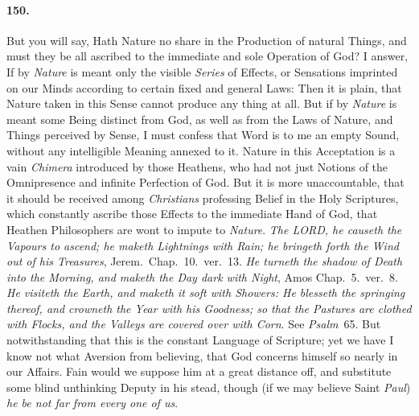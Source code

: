 \documentclass[]{article}
\newenvironment{sectionbody}{\begin{multicols}{2}}{\end{multicols}}
\begin{document}
\begin{sectionbody}
\paragraph{150.} But you will say, Hath Nature no share in the Production of
natural Things, and must they be all ascribed to the immediate
and sole Operation of {\sc God}? I answer, If by \emph{Nature}
is meant only the visible \emph{Series} of Effects, or
Sensations imprinted on our Minds according to certain fixed and
general Laws: Then it is plain, that Nature taken in this Sense
cannot produce any thing at all.  But if by \emph{Nature} is
meant some Being distinct from {\sc God}, as well as from the
Laws of Nature, and Things perceived by Sense, I must confess
that Word is to me an empty Sound, without any intelligible
Meaning annexed to it.  Nature in this Acceptation is a vain
\emph{Chimera} introduced by those Heathens, who had not just
Notions of the Omnipresence and infinite Perfection of {\sc God}.
But it is more unaccountable, that it should be received among
\emph{Christians} professing Belief in the Holy Scriptures,
which constantly ascribe those Effects to the immediate Hand of
{\sc God}, that Heathen Philosophers are wont to impute to
\emph{Nature}.  \emph{The LORD, he causeth the Vapours to ascend;
he maketh Lightnings with Rain; he bringeth forth the Wind out of
his Treasures}, Jerem.\ Chap.~10.\ ver.~13.  \emph{He turneth the
shadow of Death into the Morning, and maketh the Day dark with
Night}, Amos Chap.~5.\ ver.~8.  \emph{He visiteth the Earth, and
maketh it soft with Showers: He blesseth the springing thereof,
and crowneth the Year with his Goodness; so that the Pastures are
clothed with Flocks, and the Valleys are covered over with Corn}.
See \emph{Psalm}~65.  But notwithstanding that this is the
constant Language of Scripture; yet we have I know not what
Aversion from believing, that {\sc God} concerns himself so
nearly in our Affairs.  Fain would we suppose him at a great
distance off, and substitute some blind unthinking Deputy in his
stead, though (if we may believe Saint \emph{Paul}) \emph{he be
not far from every one of us}.




\end{sectionbody}
\end{document}
